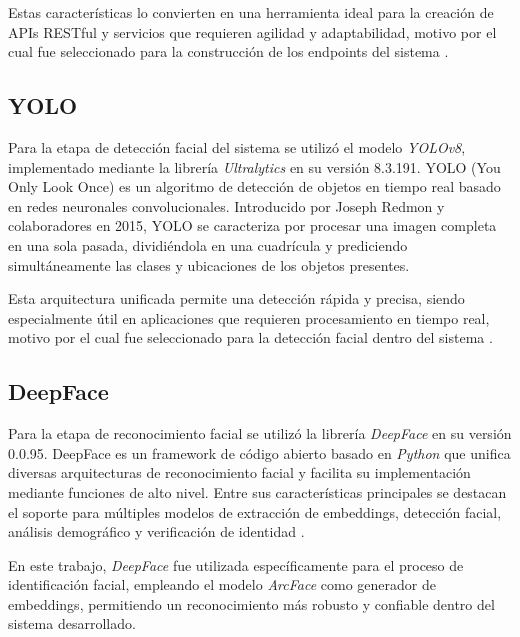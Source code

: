 Estas características lo convierten en una herramienta ideal para la creación de APIs RESTful y servicios que requieren agilidad y adaptabilidad, motivo por el cual fue seleccionado para la construcción de los endpoints del sistema \cite{flask}.

\subsection{YOLO}
Para la etapa de detección facial del sistema se utilizó el modelo \textit{YOLOv8}, implementado mediante la librería \textit{Ultralytics} en su versión 8.3.191. YOLO (You Only Look Once) es un algoritmo de detección de objetos en tiempo real basado en redes neuronales convolucionales. Introducido por Joseph Redmon y colaboradores en 2015, YOLO se caracteriza por procesar una imagen completa en una sola pasada, dividiéndola en una cuadrícula y prediciendo simultáneamente las clases y ubicaciones de los objetos presentes. 

Esta arquitectura unificada permite una detección rápida y precisa, siendo especialmente útil en aplicaciones que requieren procesamiento en tiempo real, motivo por el cual fue seleccionado para la detección facial dentro del sistema \cite{yolo}.


\subsection{DeepFace}
Para la etapa de reconocimiento facial se utilizó la librería \textit{DeepFace} en su versión 0.0.95. DeepFace es un framework de código abierto basado en \textit{Python} que unifica diversas arquitecturas de reconocimiento facial y facilita su implementación mediante funciones de alto nivel. Entre sus características principales se destacan el soporte para múltiples modelos de extracción de embeddings, detección facial, análisis demográfico y verificación de identidad \cite{DeepFace}.

En este trabajo, \textit{DeepFace} fue utilizada específicamente para el proceso de identificación facial, empleando el modelo \textit{ArcFace} como generador de embeddings, permitiendo un reconocimiento más robusto y confiable dentro del sistema desarrollado.

